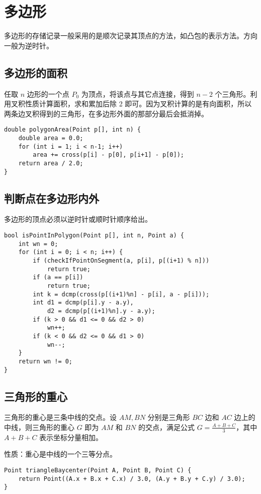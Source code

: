 \section{多边形}

多边形的存储记录一般采用的是顺次记录其顶点的方法，如凸包的表示方法。方向一般为逆时针。

\subsection{多边形的面积}

任取 $n$ 边形的一个点 $P_0$ 为顶点，将该点与其它点连接，得到 $n-2$ 个三角形。利用叉积性质计算面积，求和累加后除 2 即可。因为叉积计算的是有向面积，所以两条边叉积得到的三角形，在多边形外面的那部分最后会抵消掉。

\begin{verbatim}
double polygonArea(Point p[], int n) {
    double area = 0.0;
    for (int i = 1; i < n-1; i++)
        area += cross(p[i] - p[0], p[i+1] - p[0]);
    return area / 2.0;
}
\end{verbatim}

\subsection{判断点在多边形内外}
\noindent 多边形的顶点必须以逆时针或顺时针顺序给出。

\begin{verbatim}
bool isPointInPolygon(Point p[], int n, Point a) {
    int wn = 0;
    for (int i = 0; i < n; i++) {
        if (checkIfPointOnSegment(a, p[i], p[(i+1) % n]))
            return true;
        if (a == p[i])
            return true;
        int k = dcmp(cross(p[(i+1)%n] - p[i], a - p[i]));
        int d1 = dcmp(p[i].y - a.y),
            d2 = dcmp(p[(i+1)%n].y - a.y);
        if (k > 0 && d1 <= 0 && d2 > 0)
            wn++;
        if (k < 0 && d2 <= 0 && d1 > 0)
            wn--;
    }
    return wn != 0;
}
\end{verbatim}

\subsection{三角形的重心}
三角形的重心是三条中线的交点。设 $AM, BN$ 分别是三角形 $BC$ 边和 $AC$ 边上的中线，则三角形的重心 $G$ 即为 $AM$ 和 $BN$ 的交点，满足公式 $G=\frac{A+B+C}{3}$，其中 $A+B+C$ 表示坐标分量相加。

性质：重心是中线的一个三等分点。
\begin{verbatim}
Point triangleBaycenter(Point A, Point B, Point C) {
    return Point((A.x + B.x + C.x) / 3.0, (A.y + B.y + C.y) / 3.0);
}
\end{verbatim}

